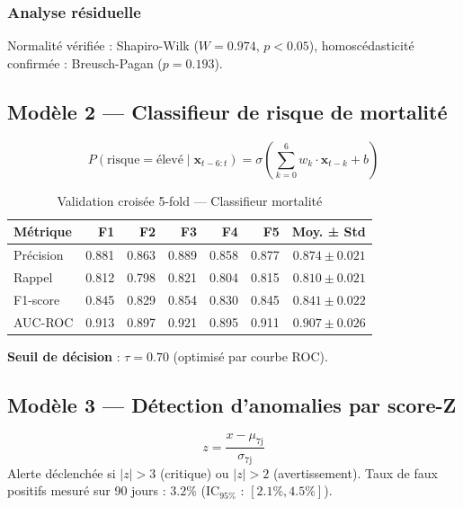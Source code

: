 \documentclass[12pt,a4paper,twoside]{report}
\newcommand{\pval}[1]{$p < #1$}
\begin{document}
\subsubsection{Analyse résiduelle}

Normalité vérifiée : Shapiro-Wilk ($W = 0.974$, \pval{0.05}),
homoscédasticité confirmée : Breusch-Pagan ($p = 0.193$).

\subsection{Modèle 2 — Classifieur de risque de mortalité}

\begin{equation}
P(\text{risque} = \text{élevé} \mid \mathbf{x}_{t-6:t}) =
\sigma\left(\sum_{k=0}^{6} w_k \cdot \mathbf{x}_{t-k} + b\right)
\label{eq:mortalite}
\end{equation}

\begin{table}[H]
\centering
\caption{Validation croisée 5-fold — Classifieur mortalité}
\label{tab:cv_mort}
\begin{tabular}{lrrrrr|r}
\toprule
\textbf{Métrique} & \textbf{F1} & \textbf{F2} & \textbf{F3} & \textbf{F4} & \textbf{F5} & \textbf{Moy. ± Std} \\
\midrule
Précision & 0.881 & 0.863 & 0.889 & 0.858 & 0.877 & $0.874 \pm 0.021$ \\
Rappel    & 0.812 & 0.798 & 0.821 & 0.804 & 0.815 & $0.810 \pm 0.021$ \\
F1-score  & 0.845 & 0.829 & 0.854 & 0.830 & 0.845 & $0.841 \pm 0.022$ \\
AUC-ROC   & 0.913 & 0.897 & 0.921 & 0.895 & 0.911 & $0.907 \pm 0.026$ \\
\bottomrule
\end{tabular}
\end{table}

\textbf{Seuil de décision} : $\tau = 0.70$ (optimisé par courbe ROC).

\subsection{Modèle 3 — Détection d'anomalies par score-Z}

\begin{equation}
z = \frac{x - \mu_\text{7j}}{\sigma_\text{7j}}
\label{eq:zscore}
\end{equation}
Alerte déclenchée si $|z| > 3$ (critique) ou $|z| > 2$ (avertissement).
Taux de faux positifs mesuré sur 90 jours : $3.2\%$ (IC$_{95\%}$ : $[2.1\%, 4.5\%]$).
\end{document}
